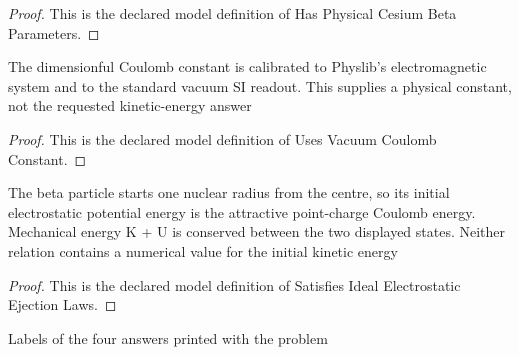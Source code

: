 \begin{proof}
  This is the declared model definition of Has Physical Cesium Beta Parameters.
\end{proof}
\begin{definition}
  \label{def:physics:phyx-mini-0636:phyxminiproblems-problemphyxmini0636-usesvacuumcoulombconstant}
  The dimensionful Coulomb constant is calibrated to Physlib's electromagnetic system and to the standard vacuum SI readout. This supplies a physical constant, not the requested kinetic-energy answer
\end{definition}
\begin{proof}
  This is the declared model definition of Uses Vacuum Coulomb Constant.
\end{proof}
\begin{definition}
  \label{def:physics:phyx-mini-0636:phyxminiproblems-problemphyxmini0636-satisfiesidealelectrostaticejectionlaws}
  The beta particle starts one nuclear radius from the centre, so its initial electrostatic potential energy is the attractive point-charge Coulomb energy. Mechanical energy K + U is conserved between the two displayed states. Neither relation contains a numerical value for the initial kinetic energy
\end{definition}
\begin{proof}
  This is the declared model definition of Satisfies Ideal Electrostatic Ejection Laws.
\end{proof}
\begin{definition}
  \label{def:physics:phyx-mini-0636:phyxminiproblems-problemphyxmini0636-answerchoice}
  Labels of the four answers printed with the problem
\end{definition}
